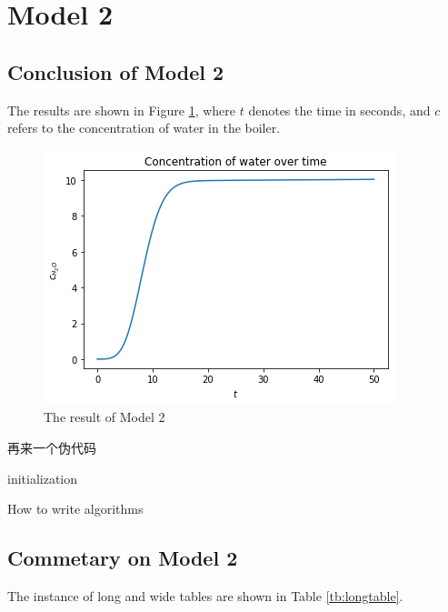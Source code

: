 \documentclass[12pt]{ctexart}
\begin{document}
\section{Model 2}
\subsection{Conclusion of Model 2}
The results are shown in Figure \ref{fig:result}, where $t$ denotes the time in seconds, and $c$ refers to the concentration of water in the boiler.

\begin{figure}[!ht]%
  \centering
  \includegraphics[width=.5\textwidth]{water.png}
  \caption{The result of Model 2}\label{fig:result}
\end{figure}%
再来一个伪代码

\begin{algorithm}[H]
  initialization\;
  \caption{How to write algorithms}
\end{algorithm}


\clearpage
\subsection{Commetary on Model 2}
The instance of long and wide tables are shown in Table \ref{tb:longtable}.
\end{document}
